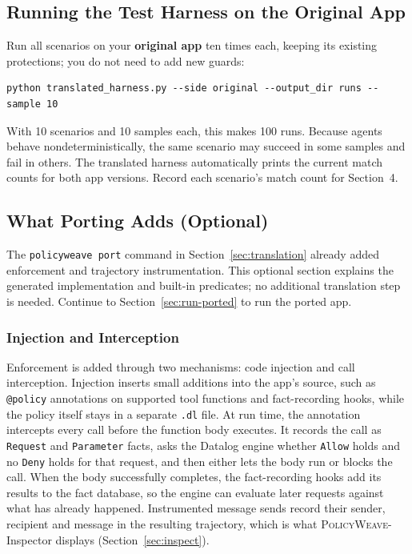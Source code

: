 \documentclass[10pt,letterpaper]{article}
\newcommand{\tool}{\textsc{PolicyWeave}}
\begin{document}
\subsection{Running the Test Harness on the Original App}

Run all scenarios on your \textbf{original app} ten times each, keeping its
existing protections; you do not need to add new guards:
\begin{lstlisting}
python translated_harness.py --side original --output_dir runs --sample 10
\end{lstlisting}
With 10 scenarios and 10 samples each, this makes 100 runs. Because agents
behave nondeterministically, the same scenario may succeed in some samples and
fail in others. The translated harness automatically prints the current
match counts for both app versions. Record each scenario's match
count for Section~4.
\subsection{What Porting Adds (Optional)}
\label{sec:port}
The \texttt{policyweave port} command in Section~\ref{sec:translation} already
added enforcement and trajectory instrumentation. This optional section explains
the generated implementation and built-in predicates; no additional translation
step is needed. Continue to Section~\ref{sec:run-ported} to run the ported app.

\subsubsection{Injection and Interception}
\label{sec:inject}

Enforcement is added through two mechanisms: code injection and call
interception. Injection inserts small additions into the app's source, such as
\texttt{@policy} annotations on supported tool functions and fact-recording
hooks, while the policy itself stays in a separate \texttt{.dl} file. At
run time, the annotation intercepts every call before the function body
executes. It records the call as \texttt{Request} and \texttt{Parameter} facts,
asks the Datalog engine whether \texttt{Allow} holds and no \texttt{Deny} holds
for that request, and then either lets the body run or blocks the call. When
the body successfully completes, the fact-recording hooks add its results to the fact
database, so the engine can evaluate later requests against what has already
happened. Instrumented message sends record their sender, recipient and message
in the resulting trajectory, which is what
{\tool}-Inspector displays (Section~\ref{sec:inspect}).
\end{document}
